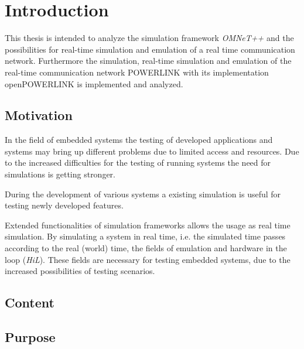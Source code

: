 \chapter{Introduction}
\label{cha:Einleitung}
This thesis is intended to analyze the simulation framework \emph{OMNeT++} and the possibilities for real-time simulation and emulation of a real time communication network.
Furthermore the simulation, real-time simulation and emulation of the real-time communication network POWERLINK with its implementation openPOWERLINK is implemented and analyzed.

\section{Motivation}
In the field of embedded systems the testing of developed applications and systems may bring up different problems due to limited access and resources.
Due to the increased difficulties for the testing of running systems the need for simulations is getting stronger.

During the development of various systems a existing simulation is useful for testing newly developed features.

Extended functionalities of simulation frameworks allows the usage as real time simulation.
By simulating a system in real time, i.e. the simulated time passes according to the real (world) time, the fields of emulation and hardware in the loop (\emph{HiL}).
These fields are necessary for testing embedded systems, due to the increased possibilities of testing scenarios.



\section{Content}

\section{Purpose}

